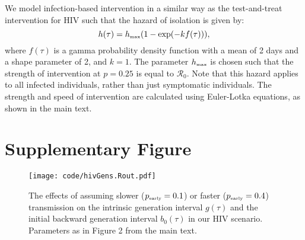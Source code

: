 \documentclass[12pt]{article}
\newcommand{\Rx}[1]{\ensuremath{{\mathcal R}_{#1}}}
\newcommand{\Ro}{\Rx{0}}
\newcommand{\tsub}[2]{#1_{{\textrm{\tiny #2}}}}
\newcommand{\pEarly}{\ensuremath{\tsub{p}{early}}}
\begin{document}
We model infection-based intervention in a similar way as the test-and-treat intervention for HIV such that the hazard of isolation is given by:
\begin{equation}
h(\tau) =  \tsub{h}{max} (1 - \exp(- k f(\tau))),
\end{equation}
where $f(\tau)$ is a gamma probability density function with a mean of 2 days and a shape parameter of 2, and $k = 1$.
The parameter $\tsub{h}{max}$ is chosen such that the strength of intervention at $p=0.25$ is equal to $\Ro$.
Note that this hazard applies to all infected individuals, rather than just symptomatic individuals.
The strength and speed of intervention are calculated using Euler-Lotka equations, as shown in the main text.

\pagebreak

\section{Supplementary Figure}

\begin{figure}[!ht]
\texttt{[image: code/hivGens.Rout.pdf]}
\caption{
The effects of assuming slower ($\pEarly=0.1$) or faster ($\pEarly=0.4$) transmission on the intrinsic generation interval $g(\tau)$ and the initial backward generation interval $b_0(\tau)$ in our HIV scenario. Parameters as in Figure 2 from the main text.
}
\end{figure}
\end{document}
